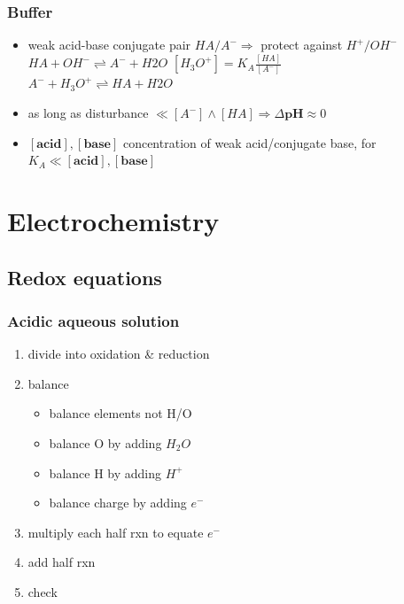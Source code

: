 \documentclass[ wastespaceontitle, english]{cheat_sheet_template}
\begin{document}
    \subsubsection{Buffer}
    \begin{itemize}
        \item weak acid-base conjugate pair $HA/A^- \Rightarrow$ protect against $H^+/OH^-$
        $HA + OH^- \rightleftharpoons A^- + H2O$ \quad
        $[H_3O^+] = K_A \frac{[HA]}{[A^-]}$\\
        $A^- + H_3O^+ \rightleftharpoons HA + H2O$ 
        \item as long as disturbance $\ll [A^-] \land [HA] \Rightarrow \Delta \textbf{pH} \approx 0$
        \item {} 
        
         $ [\textbf{acid}], [\textbf{base}]$ concentration of weak acid/conjugate base, for $K_A \ll [\textbf{acid}], [\textbf{base}]$
    \end{itemize}

    \section{Electrochemistry}
    \subsection{Redox equations}
    \subsubsection{Acidic aqueous solution}
    \begin{enumerate}
        \item divide into oxidation \& reduction
        \item balance \begin{itemize}
            \item balance elements not H/O
            \item balance O by adding $H_2O$
            \item balance H by adding $H^+$
            \item balance charge by adding $e^-$
        \end{itemize}
        \item multiply each half rxn to equate $e^-$
        \item add half rxn
        \item check
    \end{enumerate}
\end{document}

